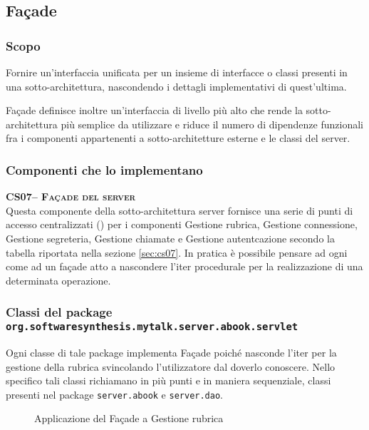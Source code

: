 \subsection{Façade}\label{sec:patternfacade}

\subsubsection{Scopo}
Fornire un'interfaccia unificata per un insieme di interfacce o classi presenti in una sotto-architettura, nascondendo i dettagli implementativi di quest'ultima.

Façade definisce inoltre un'interfaccia di livello più alto che rende la sotto-architettura più semplice da utilizzare e riduce il numero di dipendenze funzionali fra i componenti appartenenti a sotto-architetture esterne e le classi del server.

\subsubsection{Componenti che lo implementano}
\begin{description}
  \item{\scshape\bfseries CS07-- Façade del server}\\
Questa componente della sotto-architettura server fornisce una serie di punti di accesso centralizzati () per i componenti \textsf{Gestione rubrica}, \textsf{Gestione connessione}, \textsf{Gestione segreteria}, \textsf{Gestione chiamate} e \textsf{Gestione autentcazione} secondo la tabella riportata nella sezione \vref{sec:cs07}. In pratica è possibile pensare ad ogni  come ad un façade atto a nascondere l'iter procedurale per la realizzazione di una determinata operazione.
\end{description}

\subsubsection*{Classi del package \texttt{org.softwaresynthesis.mytalk.server.abook.servlet}}

Ogni classe di tale package implementa Façade poiché nasconde l'iter per la gestione della rubrica svincolando l'utilizzatore dal doverlo conoscere. Nello specifico tali classi richiamano in più punti e in maniera sequenziale, classi presenti nel package \texttt{server.abook} e \texttt{server.dao}.

\begin{figure}[H]
  \centering
  \caption{Applicazione del  Façade a \textsf{Gestione rubrica}}\label{fig:facadeaddressbook1}
\end{figure}

